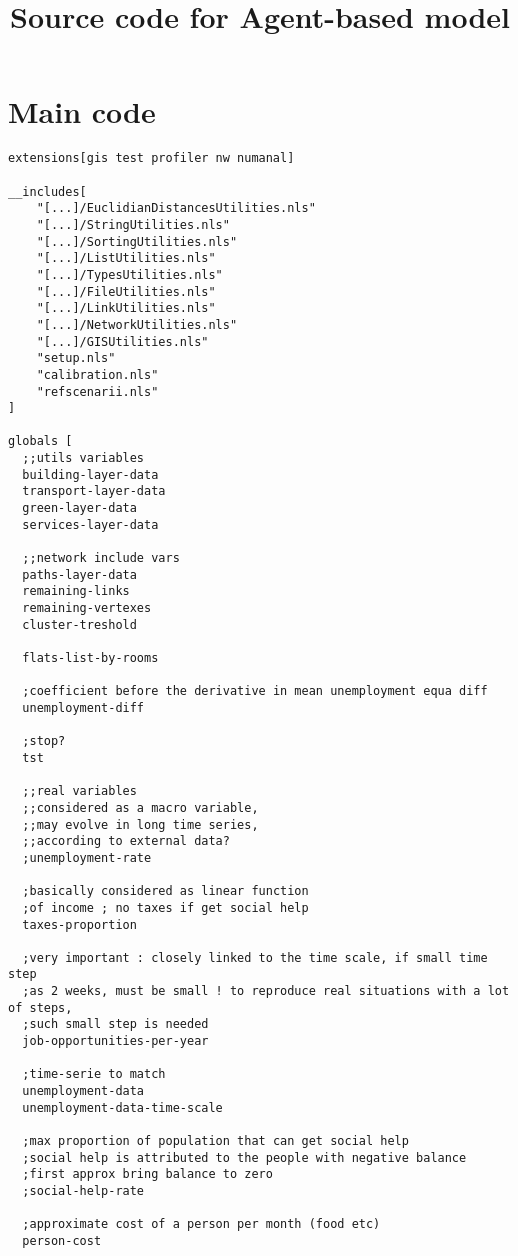 \documentclass[english]{article}
\begin{document}
\title{Source code for Agent-based model}

\maketitle

\section*{Main code}

\begin{lstlisting}[basicstyle={\scriptsize}]
extensions[gis test profiler nw numanal]

__includes[   
	"[...]/EuclidianDistancesUtilities.nls"
	"[...]/StringUtilities.nls"
	"[...]/SortingUtilities.nls"
	"[...]/ListUtilities.nls"
	"[...]/TypesUtilities.nls"
	"[...]/FileUtilities.nls"
	"[...]/LinkUtilities.nls"
	"[...]/NetworkUtilities.nls"
    "[...]/GISUtilities.nls"
	"setup.nls"
	"calibration.nls"
	"refscenarii.nls"
]

globals [
  ;;utils variables
  building-layer-data
  transport-layer-data
  green-layer-data
  services-layer-data

  ;;network include vars
  paths-layer-data
  remaining-links
  remaining-vertexes
  cluster-treshold

  flats-list-by-rooms

  ;coefficient before the derivative in mean unemployment equa diff
  unemployment-diff
  
  ;stop?
  tst

  ;;real variables
  ;;considered as a macro variable,
  ;;may evolve in long time series,
  ;;according to external data? 
  ;unemployment-rate

  ;basically considered as linear function
  ;of income ; no taxes if get social help
  taxes-proportion     

  ;very important : closely linked to the time scale, if small time step
  ;as 2 weeks, must be small ! to reproduce real situations with a lot of steps,
  ;such small step is needed
  job-opportunities-per-year 
 
  ;time-serie to match
  unemployment-data       
  unemployment-data-time-scale
       
  ;max proportion of population that can get social help
  ;social help is attributed to the people with negative balance
  ;first approx bring balance to zero
  ;social-help-rate

  ;approximate cost of a person per month (food etc)
  person-cost


\end{lstlisting}
\end{document}
